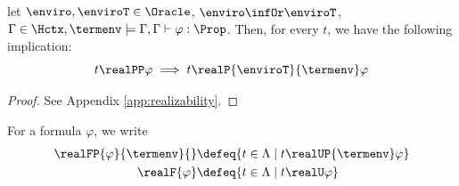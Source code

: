 \begin{proposition}\label{prop.monotonicity}
  let $\enviro, \enviroT \in \Oracle$, $\enviro \infOr \enviroT$, $\Gamma \in \Hctx, \termenv \models \Gamma, \Gamma \vdash \varphi : \Prop$. Then, for every $t$, we have the following implication:
  \[t \realPP \varphi \implies t \realP{\enviroT}{\termenv} \varphi\]
\end{proposition}
\begin{proof}See Appendix \ref{app:realizability}.
\end{proof}
\begin{notation}
  For a formula $\varphi$, we write
  \begin{align*}
    \realFP{\varphi}{\termenv}{} &\defeq \{ t \in \Lambda \mid t \realUP{\termenv} \varphi \}\\
    \realF{\varphi} &\defeq \{ t \in \Lambda \mid t \realU \varphi\}
  \end{align*}
\end{notation}


